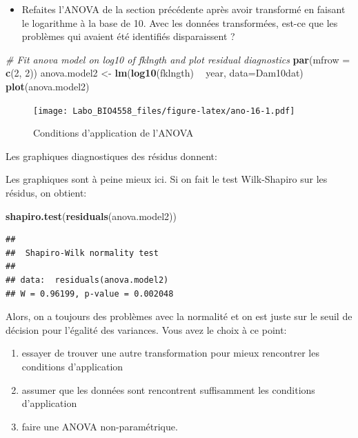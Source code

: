 \documentclass[12pt,]{book}
\newenvironment{Shaded}{\begin{snugshade}}{\end{snugshade}}
\newcommand{\CommentTok}[1]{\textcolor[rgb]{0.56,0.35,0.01}{\textit{#1}}}
\newcommand{\DataTypeTok}[1]{\textcolor[rgb]{0.13,0.29,0.53}{#1}}
\newcommand{\DecValTok}[1]{\textcolor[rgb]{0.00,0.00,0.81}{#1}}
\newcommand{\KeywordTok}[1]{\textcolor[rgb]{0.13,0.29,0.53}{\textbf{#1}}}
\newcommand{\NormalTok}[1]{#1}
\newcommand{\OperatorTok}[1]{\textcolor[rgb]{0.81,0.36,0.00}{\textbf{#1}}}
\newcommand{\StringTok}[1]{\textcolor[rgb]{0.31,0.60,0.02}{#1}}
\providecommand{\tightlist}{%
  \setlength{\itemsep}{0pt}\setlength{\parskip}{0pt}}
\begin{document}
\begin{itemize}
\tightlist
\item
  Refaites l'ANOVA de la section précédente après avoir transformé en faisant le logarithme à la base de 10. Avec les données transformées, est-ce que les problèmes qui avaient été identifiés disparaissent ?
\end{itemize}

\begin{Shaded}
\begin{Highlighting}[]
\CommentTok{# Fit anova model on log10 of fklngth and plot residual diagnostics}
\KeywordTok{par}\NormalTok{(}\DataTypeTok{mfrow =} \KeywordTok{c}\NormalTok{(}\DecValTok{2}\NormalTok{, }\DecValTok{2}\NormalTok{))}
\NormalTok{anova.model2 <-}\StringTok{ }\KeywordTok{lm}\NormalTok{(}\KeywordTok{log10}\NormalTok{(fklngth) }\OperatorTok{~}\StringTok{ }\NormalTok{year, }\DataTypeTok{data=}\NormalTok{Dam10dat)}
\KeywordTok{plot}\NormalTok{(anova.model2)}
\end{Highlighting}
\end{Shaded}

\begin{figure}
\centering
\texttt{[image: Labo\_BIO4558\_files/figure-latex/ano-16-1.pdf]}
\caption{\label{fig:ano-16}Conditions d'application de l'ANOVA}
\end{figure}

Les graphiques diagnostiques des résidus donnent:

Les graphiques sont à peine mieux ici. Si on fait le test Wilk-Shapiro sur les résidus, on obtient:

\begin{Shaded}
\begin{Highlighting}[]
\KeywordTok{shapiro.test}\NormalTok{(}\KeywordTok{residuals}\NormalTok{(anova.model2))}
\end{Highlighting}
\end{Shaded}

\begin{verbatim}
## 
##  Shapiro-Wilk normality test
## 
## data:  residuals(anova.model2)
## W = 0.96199, p-value = 0.002048
\end{verbatim}

Alors, on a toujours des problèmes avec la normalité et on est juste sur le seuil de décision pour l'égalité des variances. Vous avez le choix à ce point:

\begin{enumerate}
\def\labelenumi{\arabic{enumi}.}
\tightlist
\item
  essayer de trouver une autre transformation pour mieux rencontrer les conditions d'application
\item
  assumer que les données sont rencontrent suffisamment les conditions d'application
\item
  faire une ANOVA non-paramétrique.
\end{enumerate}
\end{document}
